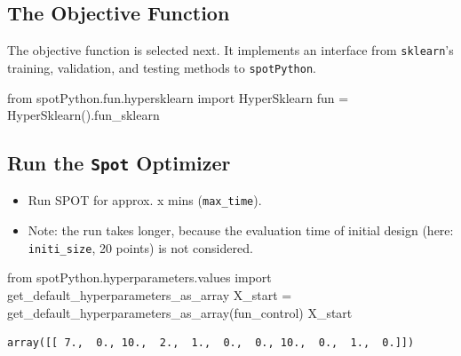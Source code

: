 \documentclass[
  letterpaper,
  DIV=11,
  numbers=noendperiod]{scrreprt}
\newenvironment{Shaded}{\begin{snugshade}}{\end{snugshade}}
\newcommand{\ImportTok}[1]{\textcolor[rgb]{0.00,0.46,0.62}{#1}}
\newcommand{\NormalTok}[1]{\textcolor[rgb]{0.00,0.23,0.31}{#1}}
\newcommand{\OperatorTok}[1]{\textcolor[rgb]{0.37,0.37,0.37}{#1}}
\providecommand{\tightlist}{%
  \setlength{\itemsep}{0pt}\setlength{\parskip}{0pt}}\usepackage{longtable,booktabs,array}
\begin{document}
\hypertarget{sec-the-objective-function-16}{%
\subsection{The Objective
Function}\label{sec-the-objective-function-16}}

The objective function is selected next. It implements an interface from
\texttt{sklearn}'s training, validation, and testing methods to
\texttt{spotPython}.

\begin{Shaded}
\begin{Highlighting}[]
\ImportTok{from}\NormalTok{ spotPython.fun.hypersklearn }\ImportTok{import}\NormalTok{ HyperSklearn}
\NormalTok{fun }\OperatorTok{=}\NormalTok{ HyperSklearn().fun\_sklearn}
\end{Highlighting}
\end{Shaded}

\hypertarget{run-the-spot-optimizer-1}{%
\subsection{\texorpdfstring{Run the \texttt{Spot}
Optimizer}{Run the Spot Optimizer}}\label{run-the-spot-optimizer-1}}

\begin{itemize}
\tightlist
\item
  Run SPOT for approx. x mins (\texttt{max\_time}).
\item
  Note: the run takes longer, because the evaluation time of initial
  design (here: \texttt{initi\_size}, 20 points) is not considered.
\end{itemize}

\begin{Shaded}
\begin{Highlighting}[]
\ImportTok{from}\NormalTok{ spotPython.hyperparameters.values }\ImportTok{import}\NormalTok{ get\_default\_hyperparameters\_as\_array}
\NormalTok{X\_start }\OperatorTok{=}\NormalTok{ get\_default\_hyperparameters\_as\_array(fun\_control)}
\NormalTok{X\_start}
\end{Highlighting}
\end{Shaded}

\begin{verbatim}
array([[ 7.,  0., 10.,  2.,  1.,  0.,  0., 10.,  0.,  1.,  0.]])
\end{verbatim}
\end{document}
